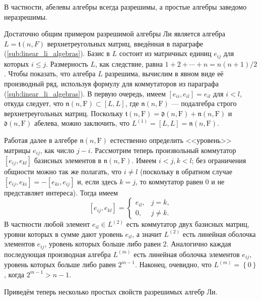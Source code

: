 \documentclass[a4paper, 12pt]{article}
\theoremstyle{definition}
\begin{document}
В частности, абелевы алгебры всегда разрешимы, а простые алгебры заведомо неразрешимы.

Достаточно общим примером разрешимой алгебры Ли является алгебра \({ L = \mathfrak{t} (n, F) }\) верхнетреугольных матриц, введённая в параграфе (\ref{sub:linear_li_algebras}). Базис в \({ L }\) состоит из матричных единиц \({ e_{ij} }\) для которых \({ i \leqslant j }\). Размерность \({ L }\), как следствие, равна \({ 1 + 2 + \cdots + n = n(n + 1)/2 }\). Чтобы показать, что алгебра \({ L }\) разрешима, вычислим в явном виде её производный ряд, используя формулу для коммутаторов из параграфа (\ref{sub:linear_li_algebras}). В первую очередь, имеем \({ [e_{ii}, e_{il}] = e_{il} }\) для \({ i < l }\), откуда следует, что \({ \mathfrak{n}(n, \mathrm F) \subset [L, L] }\), где \({ \mathfrak{n}(n, \mathrm F) }\) --- подалгебра строго верхнетреугольных матриц. Поскольку \({ \mathfrak{t}(n ,\mathrm F) = \mathfrak{d}(n, \mathrm F) + \mathfrak{n}(n, \mathrm F) }\) и \({ \mathfrak{d}(n, \mathrm F) }\) абелева, можно заключить, что \({ L^{(1)} = [L, L] = \mathfrak{n}(n, \mathrm F) }\).

Работая далее в алгебре \({ \mathfrak{n}(n, \mathrm F) }\) естественно определить <<уровень>> матрицы \({ e_{ij} }\), как число \({ j - i }\). Рассмотрим теперь произвольный коммутатор \({ [e_{ij}, e_{kl}] }\) базисных элементов в \({ \mathfrak{n}(n, \mathrm F) }\). Имеем \({ i < j, k < l }\); без ограничения общности можно так же полагать, что \({ i \neq l }\) (поскольку в обратном случае \({ [e_{ij}, e_{ki}] = -[e_{ki}, e_{ij}] }\) и, если здесь \({ k = j }\), то коммутатор равен \({ 0 }\) и не представляет интереса). Тогда имеем
\[
    [e_{ij}, e_{kl}] = \begin{cases}
        e_{il}, & j = k, \\
        0, & j \neq k.
    \end{cases}
\]
В частности любой элемент \({ e_{il} \in L^{(2)} }\) есть коммутатор двух базисных матриц, уровни которых в сумме дают уровень \({ e_{il} }\), а значит \({ L^{(2)} }\) есть линейная оболочка элементов \({ e_{ij} }\), уровень которых больше либо равен \({ 2 }\). Аналогично каждая последующая производная алгебра \({ L^{(m)} }\) есть линейная оболочка элементов \({ e_{ij} }\), уровень которых больше либо равен \({ 2^{m - 1} }\). Наконец, очевидно, что \({ L^{(m)} = \left\{ 0 \right\} }\), когда \({ 2^{m - 1} > n - 1 }\).

Приведём теперь несколько простых свойств разрешимых алгебр Ли.
\end{document}
